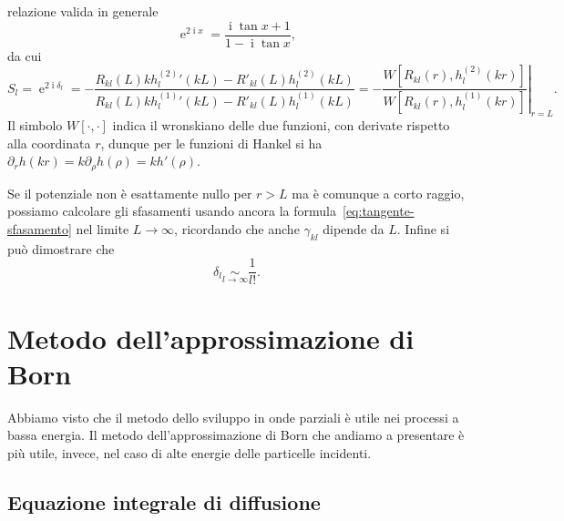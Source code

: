 \documentclass[a4paper,fleqn,twoside,12pt]{article}
\DeclareMathOperator{\e}{\mathrm{e}} %
\DeclareMathOperator{\uimm}{\mathrm{i}} %
\begin{document}
relazione valida in generale
\begin{equation}
  \e^{2\uimm x} = \frac{\uimm \tan x + 1}{1 - \uimm \tan x},
\end{equation}
da cui
\begin{equation}
  S_{l} = \e^{2\uimm\delta_{l}} = -\frac{R_{kl}(L)k h_{l}^{(2)}{}'(kL) -
    R'_{kl}(L)h_{l}^{(2)}(kL)}{R_{kl}(L)k h_{l}^{(1)}{}'(kL) -
    R'_{kl}(L)h_{l}^{(1)}(kL)} = -\left.\frac{W[R_{kl}(r),
      h_{l}^{(2)}(kr)]}{W[R_{kl}(r), h_{l}^{(1)}(kr)]}\right|_{r = L}.
\end{equation}
Il simbolo $W[\cdot,\cdot]$ indica il wronskiano delle due funzioni, con
derivate rispetto alla coordinata $r$, dunque per le funzioni di Hankel si ha
$\partial_{r}h(kr) = k \partial_{\rho}h(\rho) = k h'(\rho)$.

Se il potenziale non è esattamente nullo per $r > L$ ma è comunque a corto
raggio, possiamo calcolare gli sfasamenti usando ancora la
formula~\eqref{eq:tangente-sfasamento} nel limite $L \to \infty$, ricordando che
anche $\gamma_{kl}$ dipende da $L$.  Infine si può dimostrare che
\begin{equation}
  \delta_{l} \underset{l \to \infty}{\sim} \frac{1}{l!}.
\end{equation}

\section{Metodo dell'approssimazione di Born}
\label{sec:metodo-born}

Abbiamo visto che il metodo dello sviluppo in onde parziali è utile nei processi
a bassa energia.  Il metodo dell'approssimazione di Born che andiamo a
presentare è più utile, invece, nel caso di alte energie delle particelle
incidenti.

\subsection{Equazione integrale di diffusione}
\label{sec:equazione-integrale}
\end{document}
